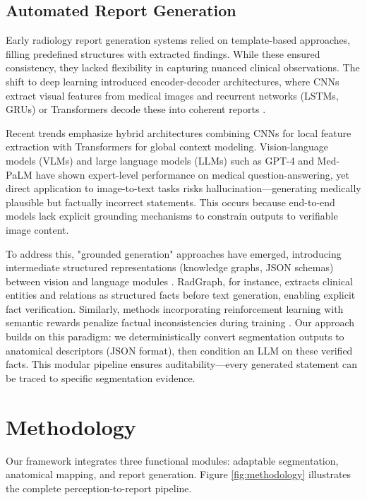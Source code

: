 \documentclass[conference]{IEEEtran}
\begin{document}
\subsection{Automated Report Generation}
Early radiology report generation systems relied on template-based approaches, filling predefined structures with extracted findings. While these ensured consistency, they lacked flexibility in capturing nuanced clinical observations. The shift to deep learning introduced encoder-decoder architectures, where CNNs extract visual features from medical images and recurrent networks (LSTMs, GRUs) or Transformers decode these into coherent reports \cite{chen2020r2gen}. 

Recent trends emphasize hybrid architectures combining CNNs for local feature extraction with Transformers for global context modeling. Vision-language models (VLMs) and large language models (LLMs) such as GPT-4 and Med-PaLM \cite{singhal2023medpalm} have shown expert-level performance on medical question-answering, yet direct application to image-to-text tasks risks hallucination—generating medically plausible but factually incorrect statements. This occurs because end-to-end models lack explicit grounding mechanisms to constrain outputs to verifiable image content.

To address this, "grounded generation" approaches have emerged, introducing intermediate structured representations (knowledge graphs, JSON schemas) between vision and language modules \cite{jain2021radgraph}. RadGraph, for instance, extracts clinical entities and relations as structured facts before text generation, enabling explicit fact verification. Similarly, methods incorporating reinforcement learning with semantic rewards penalize factual inconsistencies during training \cite{zhang2023radiology}. Our approach builds on this paradigm: we deterministically convert segmentation outputs to anatomical descriptors (JSON format), then condition an LLM on these verified facts. This modular pipeline ensures auditability—every generated statement can be traced to specific segmentation evidence.

\section{Methodology}

Our framework integrates three functional modules: adaptable segmentation, anatomical mapping, and report generation. Figure \ref{fig:methodology} illustrates the complete perception-to-report pipeline.
\end{document}
